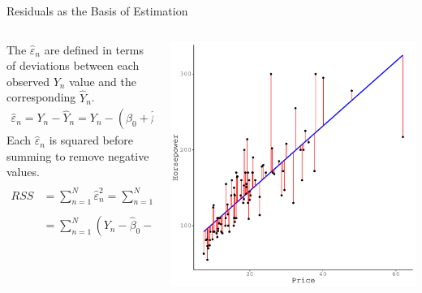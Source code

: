 \documentclass[10pt]{beamer}\usepackage[]{graphicx}\usepackage[]{color}
\makeatletter
\def\maxwidth{ %
  \ifdim\Gin@nat@width>\linewidth
    \linewidth
  \else
    \Gin@nat@width
  \fi
}
\newenvironment{knitrout}{}{} %
\makeatother
\begin{document}
\watermarkoff %

\begin{frame}{Residuals as the Basis of Estimation}

  \begin{columns}
    \begin{column}{0.5\textwidth}

      The $\hat{\varepsilon}_n$ are defined in terms of deviations between each
      observed $Y_n$ value and the corresponding $\hat{Y}_n$.
      \begin{align*}
        \hat{\varepsilon}_n = Y_n - \hat{Y}_n =
        Y_n - \left(\hat{\beta}_0 + \hat{\beta}_1 X_n\right)
      \end{align*}
      Each $\hat{\varepsilon}_n$ is squared before summing to remove negative
      values.
      \begin{align*}
        RSS &= \sum_{n = 1}^N \hat{\varepsilon}_n^2 =
              \sum_{n = 1}^N \left(Y_n - \hat{Y}_n\right)^2\\
            &= \sum_{n = 1}^N \left(Y_n - \hat{\beta}_0 - \hat{\beta}_1
              X_n\right)^2
      \end{align*}
    \end{column}

    \begin{column}{0.5\textwidth}

\begin{knitrout}\footnotesize
{}\color{fgcolor}

{\centering \includegraphics[width=\maxwidth]{figure/unnamed-chunk-7-1} 

}


\end{knitrout}

\end{column}
\end{columns}

\end{frame}
\end{document}
